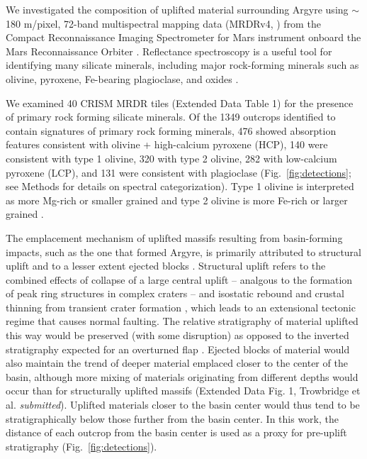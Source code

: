 \documentclass[12pt]{article}
\begin{document}
We investigated the composition of uplifted material surrounding Argyre using $\sim$180 m/pixel, 72-band multispectral mapping data (MRDRv4, \citealt{Seelos2023}) from the Compact Reconnaissance Imaging Spectrometer for Mars \citep[CRISM,][]{Murchie2007} instrument onboard the Mars Reconnaissance Orbiter \citep{Zurek2007}. Reflectance spectroscopy is a useful tool for identifying many silicate minerals, including major rock-forming minerals such as olivine, pyroxene, Fe-bearing plagioclase, and oxides \citep{Adams1967, Adams1968, Clark1984, burns1993}.

We examined 40 CRISM MRDR tiles (Extended Data Table 1) for the presence of primary rock forming silicate minerals. Of the 1349 outcrops identified to contain signatures of primary rock forming minerals, 476 showed absorption features consistent with olivine + high-calcium pyroxene (HCP), 140 were consistent with type 1 olivine, 320 with type 2 olivine, 282 with low-calcium pyroxene (LCP), and 131 were consistent with plagioclase (Fig.~\ref{fig:detections}; see Methods for details on spectral categorization). Type 1 olivine is interpreted as more Mg-rich or smaller grained and type 2 olivine is more Fe-rich or larger grained \citep{Viviano2014,Ody2013}. 

The emplacement mechanism of uplifted massifs resulting from basin-forming impacts, such as the one that formed Argyre, is primarily attributed to structural uplift \citep{Tanaka1995,Johnson2016} and to a lesser extent ejected blocks \citep{Johnson2016}. Structural uplift refers to the combined effects of collapse of a large central uplift – analgous to the formation of peak ring structures in complex craters \citep{Johnson2016} – and isostatic rebound and crustal thinning from transient crater formation \citep{Tanaka1995}, which leads to an extensional tectonic regime that causes normal faulting. The relative stratigraphy of material uplifted this way would be preserved (with some disruption) as opposed to the inverted stratigraphy expected for an overturned flap \citep{Kenkmann2014}. Ejected blocks of material would also maintain the trend of deeper material emplaced closer to the center of the basin, although more mixing of materials originating from different depths would occur than for structurally uplifted massifs (Extended Data Fig. 1, Trowbridge et al. \textit{submitted}). Uplifted materials closer to the basin center would thus tend to be stratigraphically below those further from the basin center. In this work, the distance of each outcrop from the basin center is used as a proxy for pre-uplift stratigraphy (Fig.~\ref{fig:detections}).
\end{document}
